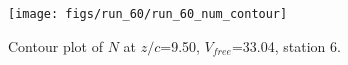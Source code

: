 \begin{figure}[H]
\centering
\texttt{[image: figs/run\_60/run\_60\_num\_contour]}
\caption{Contour plot of $N$ at $z/c$=9.50, $V_{free}$=33.04, station 6.}
\label{fig:run_60_num_contour}
\end{figure}


